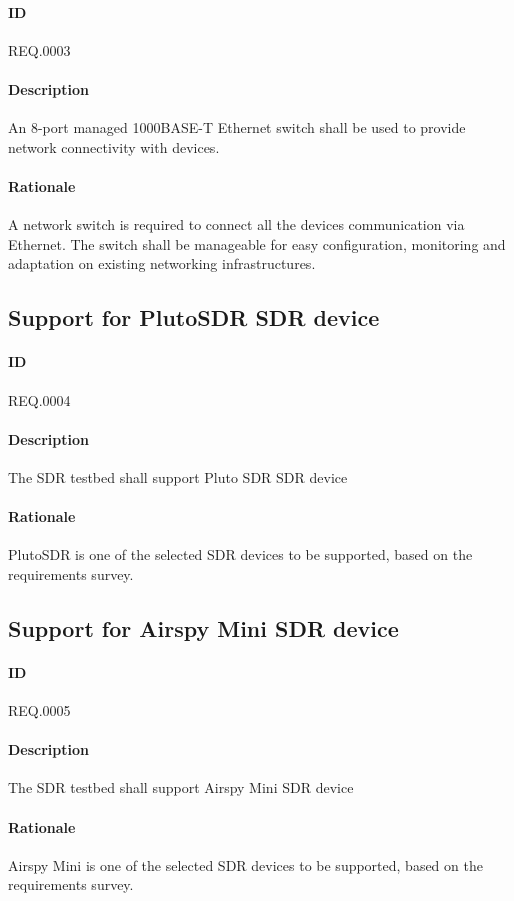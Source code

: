 \documentclass[english,titlepage,a4paper]{report}
\begin{document}
\paragraph{ID}
REQ.0003
\paragraph{Description}
An 8-port managed 1000BASE-T Ethernet switch shall be used to provide network connectivity with devices.
\paragraph{Rationale}
A network switch is required to connect all the devices communication via Ethernet.
The switch shall be manageable for easy configuration, monitoring and adaptation on existing networking infrastructures.

\subsection{Support for PlutoSDR SDR device}
\paragraph{ID}
REQ.0004
\paragraph{Description}
The SDR testbed shall support Pluto SDR SDR device
\paragraph{Rationale}
PlutoSDR is one of the selected SDR devices to be supported, based on the requirements survey.

\subsection{Support for Airspy Mini SDR device}
\paragraph{ID}
REQ.0005
\paragraph{Description}
The SDR testbed shall support Airspy Mini SDR device
\paragraph{Rationale}
Airspy Mini is one of the selected SDR devices to be supported, based on the requirements survey.
\end{document}
